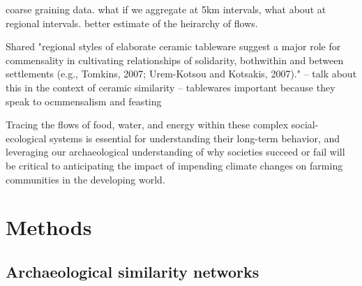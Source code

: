 \documentclass[fleqn,10pt]{wlscirep}
\begin{document}
coarse graining data. what if we aggregate at 5km intervals, what about at regional intervals. better estimate of the heirarchy of flows.

Shared "regional styles of elaborate ceramic tableware suggest a major role for commensality in cultivating relationships of solidarity, bothwithin and between settlements (e.g., Tomkins, 2007; Urem-Kotsou
and Kotsakis, 2007)." -- talk about this in the context of ceramic similarity -- tablewares important because they speak to ocmmensalism and feasting


Tracing the flows of food, water, and energy within these complex social-ecological systems is essential for understanding their long-term behavior, and leveraging our archaeological understanding of why societies succeed or fail will be critical to anticipating the impact of impending climate changes on farming communities in the developing world.

\section*{Methods}

\subsection*{Archaeological similarity networks}
\end{document}
